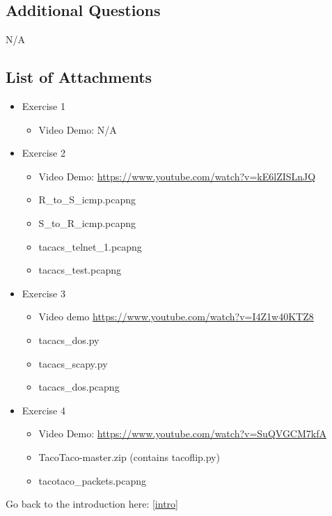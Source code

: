 \documentclass[main.tex]{subfiles}
\begin{document}
\subsection{Additional Questions}
N/A
\subsection{List of Attachments} \label{LOA}

\begin{itemize}
    \item Exercise 1
    \begin{itemize}
        \item Video Demo: N/A 
    \end{itemize}
  
    \item Exercise 2
    
    \begin{itemize}
        \item Video Demo: \url{https://www.youtube.com/watch?v=kE6lZISLnJQ}
        \item R\_to\_S\_icmp.pcapng
        \item S\_to\_R\_icmp.pcapng
        \item tacacs\_telnet\_1.pcapng
        \item tacacs\_test.pcapng
    \end{itemize}
    
     \item Exercise 3
    
    \begin{itemize}
        \item Video demo \url{https://www.youtube.com/watch?v=I4Z1w40KTZ8}
        \item tacacs\_dos.py
        \item tacacs\_scapy.py
        \item tacacs\_dos.pcapng
    \end{itemize}
    
     \item Exercise 4
    
    \begin{itemize}
        \item Video Demo: \url{https://www.youtube.com/watch?v=SuQVGCM7kfA}
        \item TacoTaco-master.zip (contains tacoflip.py)
        \item tacotaco\_packets.pcapng
    \end{itemize}
\end{itemize}

Go back to the introduction here: \ref{intro}
\end{document}

